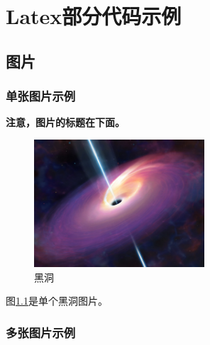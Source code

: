 \thispagestyle{main}
\chapter{Latex部分代码示例}
\thispagestyle{main}

\section{图片}

\subsection{单张图片示例}

\par \textbf{注意，图片的标题在下面。}

\begin{figure}[!ht]
    \centering
    \includegraphics[width=2.5in]{images/blackhole.jpeg}
    \caption{黑洞}
    \label{fig:blackhole1}
\end{figure}
图\ref{fig:blackhole1}是单个黑洞图片。

\subsection{多张图片示例}


